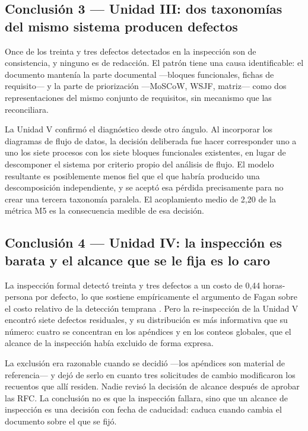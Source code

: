 \subsection*{Conclusión 3 --- Unidad III: dos taxonomías del mismo sistema producen defectos}

Once de los treinta y tres defectos detectados en la inspección son de consistencia, y ninguno es de
redacción. El patrón tiene una causa identificable: el documento mantenía la parte documental
---bloques funcionales, fichas de requisito--- y la parte de priorización ---MoSCoW, WSJF, matriz---
como dos representaciones del mismo conjunto de requisitos, sin mecanismo que las reconciliara.

La Unidad V confirmó el diagnóstico desde otro ángulo. Al incorporar los diagramas de flujo de datos,
la decisión deliberada fue hacer corresponder uno a uno los siete procesos con los siete bloques
funcionales existentes, en lugar de descomponer el sistema por criterio propio del análisis de flujo.
El modelo resultante es posiblemente menos fiel que el que habría producido una descomposición
independiente, y se aceptó esa pérdida precisamente para no crear una tercera taxonomía paralela. El
acoplamiento medio de 2,20 de la métrica M5 es la consecuencia medible de esa decisión.

\subsection*{Conclusión 4 --- Unidad IV: la inspección es barata y el alcance que se le fija es lo caro}

La inspección formal detectó treinta y tres defectos a un costo de 0,44 horas-persona por defecto, lo
que sostiene empíricamente el argumento de Fagan sobre el costo relativo de la detección temprana
\cite{fagan1976}. Pero la re-inspección de la Unidad V encontró siete defectos residuales, y su
distribución es más informativa que su número: cuatro se concentran en los apéndices y en los
conteos globales, que el alcance de la inspección había excluido de forma expresa.

La exclusión era razonable cuando se decidió ---los apéndices son material de referencia--- y dejó de
serlo en cuanto tres solicitudes de cambio modificaron los recuentos que allí residen. Nadie revisó
la decisión de alcance después de aprobar las RFC. La conclusión no es que la inspección fallara,
sino que un alcance de inspección es una decisión con fecha de caducidad: caduca cuando cambia el
documento sobre el que se fijó.

